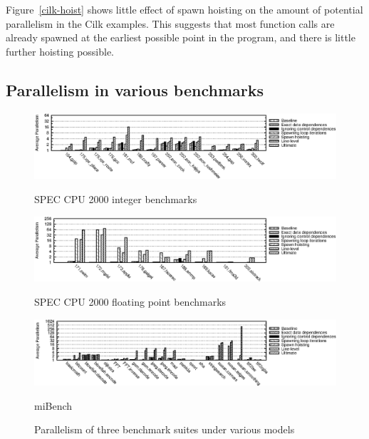 Figure~\ref{cilk-hoist} shows little effect of spawn hoisting on the amount of potential parallelism in the Cilk examples.
This suggests that most function calls are already spawned at the earliest possible point in the program, and there is little further hoisting possible.

\subsection{Parallelism in various benchmarks}

\begin{figure}
 \centering
 \begin{subfloat}
 \includegraphics[width=6.5in]{spec}
 \caption{SPEC CPU 2000 integer benchmarks}
 \label{spec}
 \end{subfloat}

 \begin{subfloat}
 \centering
 \includegraphics[width=6.5in]{specfp}
 \caption{SPEC CPU 2000 floating point benchmarks}
 \label{specfp}
 \end{subfloat}

 \begin{subfloat}
 \centering
 \includegraphics[width=6.5in]{mb}
 \caption{miBench}
 \label{mb}
 \end{subfloat}
\caption{Parallelism of three benchmark suites under various models}
\label{benchmarks}
\end{figure}

